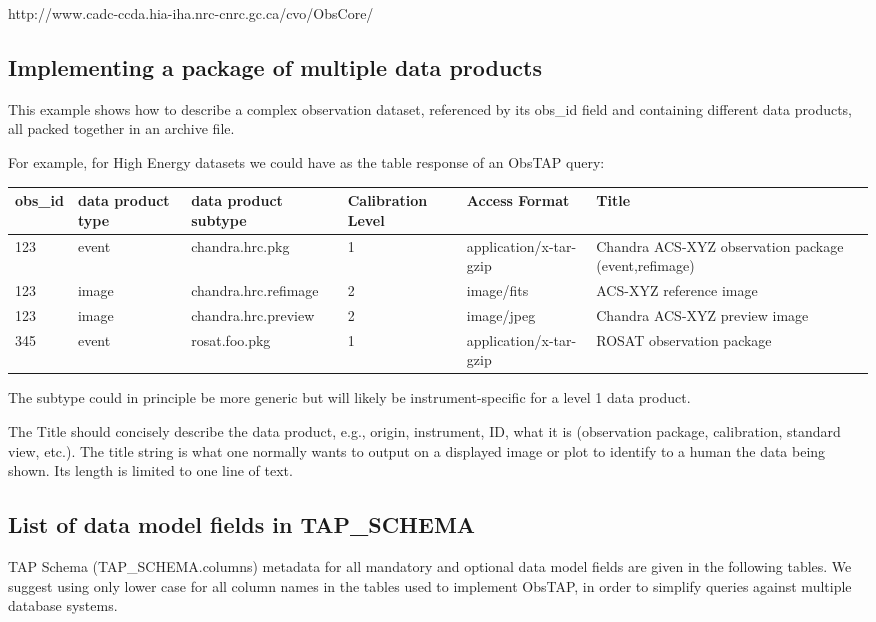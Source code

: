 \documentclass[11pt,a4paper]{ivoa}
\begin{document}
http://www.cadc-ccda.hia-iha.nrc-cnrc.gc.ca/cvo/ObsCore/ 

\subsection{Implementing a package of multiple data products}
This example shows how to describe a complex observation dataset, referenced by its obs\_id field and containing
different data products, all packed together in an archive file.

For example, for High Energy datasets we could have as the table response of an ObsTAP query: 

\begin{tabular}{|l|p{}|p{}|p{}|p{}|p{}|p{}|}
\hline
obs\_id & data product type & data product subtype   & Calibration Level   & Access Format   & Title\\\hline
 123   & event   & chandra.hrc.pkg   & 1 & application/x-tar-gzip   & Chandra ACS-XYZ observation package (event,refimage)\\\hline
123   & image   & chandra.hrc.refimage   & 2 & image/fits   & ACS-XYZ reference image\\\hline
123   & image   & chandra.hrc.preview   & 2 & image/jpeg   & Chandra ACS-XYZ preview image\\\hline
345   & event   & rosat.foo.pkg   & 1 & application/x-tar-gzip & ROSAT observation package\\\hline
\end{tabular}
The subtype could in principle be more generic but will likely be instrument-specific for a level 1 data product.

The Title should concisely describe the data product, e.g., origin, instrument, ID, what it is (observation package,
calibration, standard view, etc.).  The title string is what one normally wants to output on a displayed image or plot
to identify to a human the data being shown. Its length is limited to one line of text.

\subsection[List of data model fields in TAP\_SCHEMA]{List of data model fields in TAP\_SCHEMA}
TAP Schema (TAP\_SCHEMA.columns) metadata for all mandatory and optional data model fields are given in the following
tables.  We suggest using only lower case for all column names in the tables used to implement ObsTAP, in order to
simplify queries against multiple database systems. 
\end{document}
